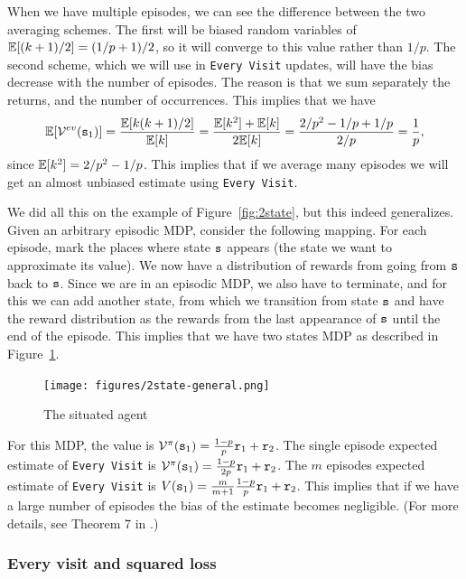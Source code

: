 \begin{advanced}
When we have multiple episodes, we can see the difference between
the two averaging schemes. The first will be biased random variables
of $\mathbb{E}[(k+1)/2]=(1/p+1)/2$, so it will converge to this value rather
than $1/p$. The second scheme, which we will use in {\tt Every
Visit} updates, will have the bias decrease with the number of
episodes. The reason is that we sum separately the returns, and the
number of occurrences. This implies that we have
\[
\mathbb{E}[\mathcal{V}^{ev}({\tt s}_1)]=\frac{\mathbb{E}[k(k+1)/2]}{\mathbb{E}[k]}=\frac{\mathbb{E}[k^2]+\mathbb{E}[k]}{2\mathbb{E}[k]}=
\frac{2/p^2-1/p+1/p}{2/p}=\frac{1}{p},
\]
since $\mathbb{E}[k^2]=2/p^2-1/p$. This implies that if we average many
episodes we will get an almost unbiased estimate using {\tt Every
Visit}.

We did all this on the example of Figure~\ref{fig:2state}, but this
indeed generalizes. Given an arbitrary episodic MDP, consider the
following mapping. For each episode, mark the places where state
${\tt s}$ appears (the state we want to approximate its value). We
now have a distribution of rewards from going from ${\tt s}$ back to
${\tt s}$. Since we are in an episodic MDP, we also have to
terminate, and for this we can add another state, from which we
transition from state ${\tt s}$ and have the reward distribution as
the rewards from the last appearance of ${\tt s}$ until the end of
the episode.
This implies that we have two states MDP as described in
Figure~\ref{fig:2state-general}.


\begin{figure}
\texttt{[image: figures/2state-general.png]}
  \caption{The situated agent}\label{fig:2state-general}
\end{figure}


For this MDP, the value is
$\mathcal{V}^\pi({\tt s}_1)=\frac{1-p}{p}{\tt r}_1+{\tt r}_2$. The single
episode expected estimate of {\tt Every Visit} is
$\mathcal{V}^\pi({\tt s}_1)=\frac{1-p}{2p}{\tt r}_1+{\tt r}_2$. The $m$
episodes expected estimate of {\tt Every Visit} is
$V({\tt s}_1)=\frac{m}{m+1}\frac{1-p}{p}{\tt r}_1+{\tt r}_2$. This
implies that if we have a large number of episodes the bias of the
estimate becomes negligible. (For more details, see Theorem 7 in
\cite{SinghS96}.)


\subsubsection*{Every visit and squared loss}


\end{advanced}

